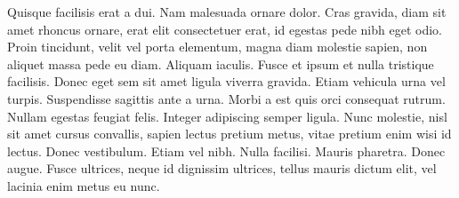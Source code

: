 


Quisque facilisis erat a dui. Nam malesuada ornare dolor. Cras gravida, diam sit amet rhoncus ornare, erat elit consectetuer erat, id egestas pede nibh eget odio. Proin tincidunt, velit vel porta elementum, magna diam molestie sapien, non aliquet massa pede eu diam. Aliquam iaculis. Fusce et ipsum et nulla tristique facilisis. Donec eget sem sit amet ligula viverra gravida. Etiam vehicula urna vel turpis. Suspendisse sagittis ante a urna. Morbi a est quis orci consequat rutrum. Nullam egestas feugiat felis. Integer adipiscing semper ligula. Nunc molestie, nisl sit amet cursus convallis, sapien lectus pretium metus, vitae pretium enim wisi id lectus. Donec vestibulum. Etiam vel nibh. Nulla facilisi. Mauris pharetra. Donec augue. Fusce ultrices, neque id dignissim ultrices, tellus mauris dictum elit, vel lacinia enim metus eu nunc.


